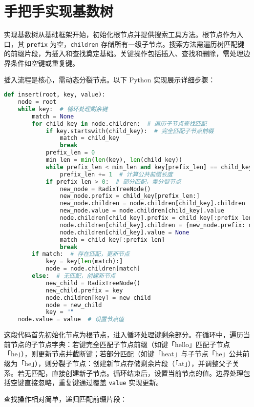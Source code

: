 \chapter{手把手实现基数树}
实现基数树从基础框架开始，初始化根节点并提供搜索工具方法。根节点作为入口，其 \verb!prefix! 为空，\verb!children! 存储所有一级子节点。搜索方法需遍历树匹配键的前缀片段，为插入和查找奠定基础。关键操作包括插入、查找和删除，需处理边界条件如空键或重复键。\par
插入流程是核心，需动态分裂节点。以下 Python 实现展示详细步骤：\par
\begin{lstlisting}[language=python]
def insert(root, key, value):
    node = root
    while key:  # 循环处理剩余键
        match = None
        for child_key in node.children:  # 遍历子节点查找匹配
            if key.startswith(child_key):  # 完全匹配子节点前缀
                match = child_key
                break
            prefix_len = 0
            min_len = min(len(key), len(child_key))
            while prefix_len < min_len and key[prefix_len] == child_key[prefix_len]:
                prefix_len += 1  # 计算公共前缀长度
            if prefix_len > 0:  # 部分匹配，需分裂节点
                new_node = RadixTreeNode()
                new_node.prefix = child_key[prefix_len:]
                new_node.children = node.children[child_key].children
                new_node.value = node.children[child_key].value
                node.children[child_key].prefix = child_key[:prefix_len]
                node.children[child_key].children = {new_node.prefix: new_node}
                node.children[child_key].value = None
                match = child_key[:prefix_len]
                break
        if match:  # 存在匹配，更新节点
            key = key[len(match):]
            node = node.children[match]
        else:  # 无匹配，创建新节点
            new_child = RadixTreeNode()
            new_child.prefix = key
            node.children[key] = new_child
            node = new_child
            key = ""
    node.value = value  # 设置节点值
\end{lstlisting}
这段代码首先初始化节点为根节点，进入循环处理键剩余部分。在循环中，遍历当前节点的子节点字典：若键完全匹配子节点前缀（如键「hello」匹配子节点「he」），则更新节点并截断键；若部分匹配（如键「heat」与子节点「he」公共前缀为「he」），则分裂子节点：创建新节点存储剩余片段（「at」），并调整父子关系。若无匹配，直接创建新子节点。循环结束后，设置当前节点的值。边界处理包括空键直接忽略，重复键通过覆盖 \verb!value! 实现更新。\par
查找操作相对简单，递归匹配前缀片段：\par
